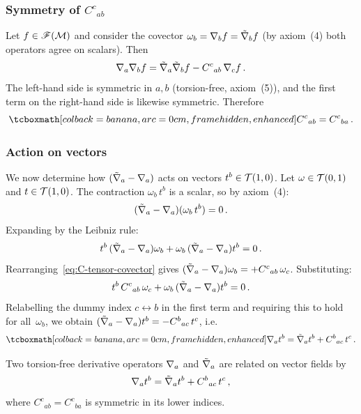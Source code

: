 \subsubsection{Symmetry of $C^c{}_{ab}$}%
\label{sec:C-symmetry}

Let $f\in\mathscr{F}(\mathcal{M})$ and consider the covector
$\omega_b = \nabla_b f = \tilde{\nabla}_b f$ (by axiom~(4) both
operators agree on scalars).  Then
\begin{equation}\label{eq:C-symmetry-derivation}
  \nabla_a\nabla_b f
    = \tilde{\nabla}_a\tilde{\nabla}_b f
      - C^c{}_{ab}\,\nabla_c f\,.
\end{equation}
The left-hand side is symmetric in $a,b$ (torsion-free,
axiom~(5)), and the first term on the right-hand side is
likewise symmetric.  Therefore
\begin{equation}\label{eq:C-symmetric}
  \eqbox{C^c{}_{ab} = C^c{}_{ba}}\,.
\end{equation}

\subsubsection{Action on vectors}\label{sec:C-on-vectors}

We now determine how $(\tilde{\nabla}_a - \nabla_a)$ acts on
vectors $t^b\in\mathcal{T}(1,0)$.  Let $\omega\in\mathcal{T}(0,1)$ and
$t\in\mathcal{T}(1,0)$.  The contraction $\omega_b\,t^b$ is a
scalar, so by axiom~(4):
\begin{equation}\label{eq:diff-scalar-zero}
  (\tilde{\nabla}_a - \nabla_a)(\omega_b\, t^b) = 0\,.
\end{equation}
Expanding by the Leibniz rule:
\[
  t^b\,(\tilde{\nabla}_a - \nabla_a)\omega_b
  + \omega_b\,(\tilde{\nabla}_a - \nabla_a)t^b = 0\,.
\]
Rearranging~\eqref{eq:C-tensor-covector} gives
$(\tilde{\nabla}_a - \nabla_a)\omega_b = +C^c{}_{ab}\,\omega_c$.
Substituting:
\[
  t^b\,C^c{}_{ab}\,\omega_c
  + \omega_b\,(\tilde{\nabla}_a - \nabla_a)t^b = 0\,.
\]
Relabelling the dummy index $c\leftrightarrow b$ in the first term
and requiring this to hold for all~$\omega_b$, we obtain
$(\tilde{\nabla}_a - \nabla_a)t^b = -C^b{}_{ac}\,t^c$, i.e.
\begin{equation}\label{eq:C-tensor-vector}
  \eqbox{\covd_a t^b
    = \tilde\covd_a t^b + C^b{}_{ac}\, t^c}\,.
\end{equation}

\begin{keyresult}
  Two torsion-free derivative operators $\nabla_a$ and
  $\tilde{\nabla}_a$ are related on vector fields by
  \[
    \nabla_a t^b = \tilde{\nabla}_a t^b + C^b{}_{ac}\, t^c\,,
  \]
  where $C^c{}_{ab} = C^c{}_{ba}$ is symmetric in its lower
  indices.
\end{keyresult}

